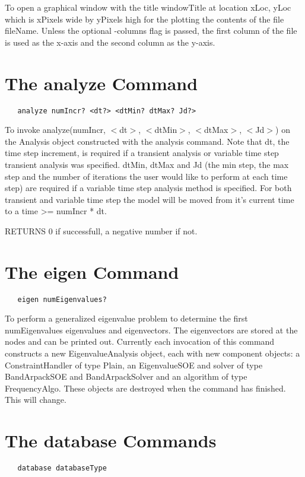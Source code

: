 \documentclass[12pt]{article}
\begin{document}
\noindent To open a graphical window with the title windowTitle at location
xLoc, yLoc which is xPixels wide by yPixels high for the plotting the
contents of the file fileName. Unless the optional -columns flag is
passed, the first column of the file is used as the x-axis and the
second column as the y-axis. 

\section {The analyze Command}
{\sf\small
\begin{verbatim}
   analyze numIncr? <dt?> <dtMin? dtMax? Jd?>
\end{verbatim}
}

\noindent To invoke analyze(numIncr, $<$dt$>$, $<$dtMin$>$,
$<$dtMax$>$, $<$Jd$>$) on the Analysis object constructed with the
analysis command. Note that dt, the time step increment, is required
if a transient analysis or variable time step transient analysis was
specified. dtMin, dtMax and Jd (the min step, the max step and the
number of iterations the user would like to perform at each time step)
are required if a variable time step analysis method is specified.
For both transient and variable time step the model will be moved from
it's current time to a time >= numIncr * dt.

RETURNS $0$ if successfull, a negative number if not.



\section {The eigen Command}
{\sf\small
\begin{verbatim}
   eigen numEigenvalues?
\end{verbatim}
}

\noindent To perform a generalized eigenvalue problem to determine the
first numEigenvalues eigenvalues and eigenvectors. The eigenvectors
are stored at the nodes and can be printed out. Currently each
invocation of this command constructs a new EigenvalueAnalysis object,
each with new component objects: a ConstraintHandler of type Plain, an
EigenvalueSOE and solver of type BandArpackSOE and BandArpackSolver
and an algorithm of type FrequencyAlgo. These objects are destroyed
when the command has finished. This will change.

\section {The database Commands}
{\sf\small
\begin{verbatim}
   database databaseType 
\end{verbatim}
}
\end{document}
